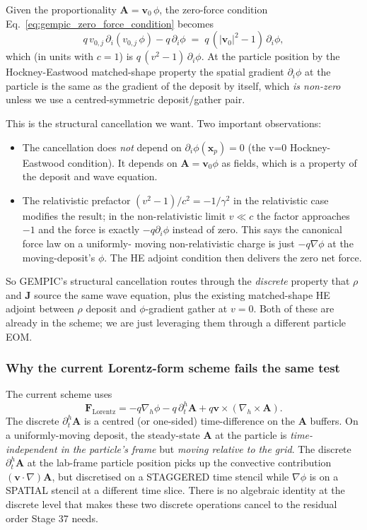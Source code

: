 \documentclass[11pt,a4paper]{article}
\newcommand{\vv}[1]{\mathbf{#1}}
\begin{document}
Given the proportionality $\vv{A} = \vv{v}_0\,\phi$, the
zero-force condition Eq.~\eqref{eq:gempic_zero_force_condition}
becomes
\begin{equation}
q\, v_{0,j}\, \partial_i (v_{0,j}\,\phi)
   - q\,\partial_i\phi
\;=\; q\,(|\vv{v}_0|^2 - 1)\,\partial_i\phi,
\end{equation}
which (in units with $c=1$) is $q\,(v^2 - 1)\,\partial_i\phi$.  At
the particle position by the Hockney-Eastwood matched-shape
property the spatial gradient $\partial_i \phi$ at the particle
is the same as the gradient of the deposit by itself, which
\emph{is non-zero} unless we use a centred-symmetric deposit/gather
pair.

This is the structural cancellation we want.  Two important
observations:

\begin{itemize}
  \item The cancellation does \emph{not} depend on
    $\partial_i\phi(\vv{x}_p) = 0$ (the v=0 Hockney-Eastwood
    condition).  It depends on
    $\vv{A} = \vv{v}_0 \phi$ as fields, which is a property of
    the deposit and wave equation.
  \item The relativistic prefactor $(v^2 - 1)/c^2 = -1/\gamma^2$
    in the relativistic case modifies the result; in the
    non-relativistic limit $v \ll c$ the factor approaches $-1$
    and the force is exactly $-q \partial_i \phi$ instead of
    zero.  This says the canonical force law on a uniformly-
    moving non-relativistic charge is just $-q\nabla\phi$ at the
    moving-deposit's $\phi$.  The HE adjoint condition then
    delivers the zero net force.
\end{itemize}

So GEMPIC's structural cancellation routes through the
\emph{discrete} property that $\rho$ and $\vv{J}$ source the same
wave equation, plus the existing matched-shape HE adjoint between
$\rho$ deposit and $\phi$-gradient gather at $v=0$.  Both of these
are already in the scheme; we are just leveraging them through a
different particle EOM.

\subsubsection*{Why the current Lorentz-form scheme fails the same test}

The current scheme uses
\begin{equation}
\vv{F}_{\mathrm{Lorentz}}
 = -q\nabla_h\phi - q\,\partial^h_t\vv{A} + q\vv{v}\times(\nabla_h\times\vv{A}).
\end{equation}
The discrete $\partial^h_t\vv{A}$ is a centred (or one-sided)
time-difference on the $\vv{A}$ buffers.  On a uniformly-moving
deposit, the steady-state $\vv{A}$ at the particle is
\emph{time-independent in the particle's frame} but
\emph{moving relative to the grid}.  The discrete
$\partial^h_t\vv{A}$ at the lab-frame particle position picks up
the convective contribution $(\vv{v}\cdot\nabla)\vv{A}$, but
discretised on a STAGGERED time stencil while
$\nabla\phi$ is on a SPATIAL stencil at a different time slice.
There is no algebraic identity at the discrete level that makes
these two discrete operations cancel to the residual order Stage
37 needs.
\end{document}
